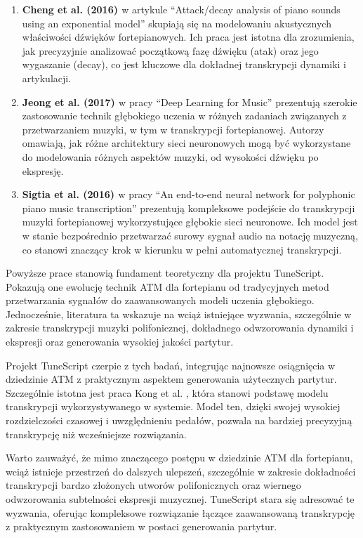\documentclass[a4paper,twoside,12pt]{book}
\begin{document}
\begin{enumerate}
	\item \textbf{Cheng et al. (2016) \cite{bib:cheng2016attack}} w artykule ``Attack/decay analysis of piano sounds using an exponential model'' skupiają się na modelowaniu akustycznych właściwości dźwięków fortepianowych. Ich praca jest istotna dla zrozumienia, jak precyzyjnie analizować początkową fazę dźwięku (atak) oraz jego wygaszanie (decay), co jest kluczowe dla dokładnej transkrypcji dynamiki i artykulacji.
	          
	\item \textbf{Jeong et al. (2017) \cite{bib:jeong2017deep}} w pracy ``Deep Learning for Music'' prezentują szerokie zastosowanie technik głębokiego uczenia w różnych zadaniach związanych z przetwarzaniem muzyki, w tym w transkrypcji fortepianowej. Autorzy omawiają, jak różne architektury sieci neuronowych mogą być wykorzystane do modelowania różnych aspektów muzyki, od wysokości dźwięku po ekspresję.
	        
	\item \textbf{Sigtia et al. (2016) \cite{bib:sigtia2016end}} w pracy ``An end-to-end neural network for polyphonic piano music transcription'' prezentują kompleksowe podejście do transkrypcji muzyki fortepianowej wykorzystujące głębokie sieci neuronowe. Ich model jest w stanie bezpośrednio przetwarzać surowy sygnał audio na notację muzyczną, co stanowi znaczący krok w kierunku w pełni automatycznej transkrypcji.
\end{enumerate}

Powyższe prace stanowią fundament teoretyczny dla projektu TuneScript. Pokazują one ewolucję technik ATM dla fortepianu od tradycyjnych metod przetwarzania sygnałów do zaawansowanych modeli uczenia głębokiego. Jednocześnie, literatura ta wskazuje na wciąż istniejące wyzwania, szczególnie w zakresie transkrypcji muzyki polifonicznej, dokładnego odwzorowania dynamiki i ekspresji oraz generowania wysokiej jakości partytur.

Projekt TuneScript czerpie z tych badań, integrując najnowsze osiągnięcia w dziedzinie ATM z praktycznym aspektem generowania użytecznych partytur. Szczególnie istotna jest praca Kong et al. \cite{bib:kong2020high}, która stanowi podstawę modelu transkrypcji wykorzystywanego w systemie. Model ten, dzięki swojej wysokiej rozdzielczości czasowej i uwzględnieniu pedałów, pozwala na bardziej precyzyjną transkrypcję niż wcześniejsze rozwiązania.

Warto zauważyć, że mimo znaczącego postępu w dziedzinie ATM dla fortepianu, wciąż istnieje przestrzeń do dalszych ulepszeń, szczególnie w zakresie dokładności transkrypcji bardzo złożonych utworów polifonicznych oraz wiernego odwzorowania subtelności ekspresji muzycznej. TuneScript stara się adresować te wyzwania, oferując kompleksowe rozwiązanie łączące zaawansowaną transkrypcję z praktycznym zastosowaniem w postaci generowania partytur.
\end{document}
